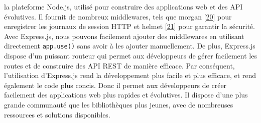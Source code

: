 \documentclass[12pt]{article}
\begin{document}
\begin{itemize}
                  la plateforme Node.js, utilisé pour construire des applications web et
                  des API évolutives. Il fournit de nombreux middlewares, tels que
                  morgan \protect\hyperlink{ref-morgan}{{[}20{]}} pour enregistrer les
                  journaux de session HTTP et helmet
                  \protect\hyperlink{ref-helmet}{{[}21{]}} pour garantir la sécurité.
                  Avec Express.js, nous pouvons facilement ajouter des middlewares en
                  utilisant directement \texttt{app.use()} sans avoir à les ajouter
                  manuellement. De plus, Express.js dispose d'un puissant routeur qui
                  permet aux développeurs de gérer facilement les routes et de
                  construire des API REST de manière efficace. Par conséquent,
                  l'utilisation d'Express.js rend la développement plus facile et plus
                  efficace, et rend également le code plus concis. Donc il permet aux
                  développeurs de créer facilement des applications web plus rapides et
                  évolutives. Il dispose d'une plus grande communauté que les
                  bibliothèques plus jeunes, avec de nombreuses ressources et solutions
                  disponibles.
      \end{itemize}

      \newpage
\end{document}
